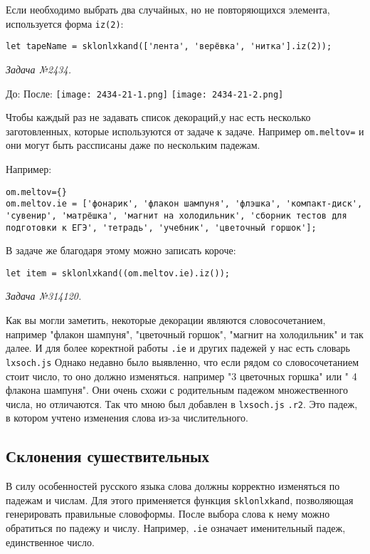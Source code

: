Если необходимо выбрать два случайных, но не повторяющихся элемента, используется форма \texttt{iz(2)}:  
\begin{lstlisting}
let tapeName = sklonlxkand(['лента', 'верёвка', 'нитка'].iz(2));
\end{lstlisting}
\textsl{Задача №2434.}
 
До:
После:
\texttt{[image: 2434-21-1.png]}
\texttt{[image: 2434-21-2.png]}

Чтобы каждый раз не задавать список декораций,у нас есть несколько заготовленных, которые используются от задаче к задаче. Например \texttt{om.meltov={}} и они могут быть рассписаны даже по нескольким падежам.

Например: 
\begin{lstlisting}
om.meltov={}
om.meltov.ie = ['фонарик', 'флакон шампуня', 'флэшка', 'компакт-диск', 'сувенир', 'матрёшка', 'магнит на холодильник', 'сборник тестов для подготовки к ЕГЭ', 'тетрадь', 'учебник', 'цветочный горшок'];
\end{lstlisting}
В задаче же благодаря этому можно записать короче:
\begin{lstlisting}
let item = sklonlxkand((om.meltov.ie).iz());
\end{lstlisting}
\textsl{Задача №314120.}

Как вы могли заметить, некоторые декорации являются словосочетанием, например "флакон шампуня", "цветочный горшок", "магнит на холодильник" и так далее. И для более коректной работы \texttt{.ie} и других падежей у нас есть словарь \texttt{lxsoch.js}
Однако недавно было выявленно, что если рядом со словосочетанием стоит число, то оно должно изменяться. например "3 цветочных горшка" или " 4 флакона шампуня". Они очень схожи с родительным падежом множественного числа, но отличаются. Так что мною был добавлен в  
\texttt{lxsoch.js} \texttt{.r2}. Это падеж, в котором учтено изменения слова из-за числительного. 

\subsection{Склонения сушествительных}

В силу особенностей русского языка слова должны корректно изменяться по падежам и числам. Для этого применяется функция \texttt{sklonlxkand}, позволяющая генерировать правильные словоформы.  
После выбора слова к нему можно обратиться по падежу и числу. Например, \texttt{.ie} означает именительный падеж, единственное число.  


